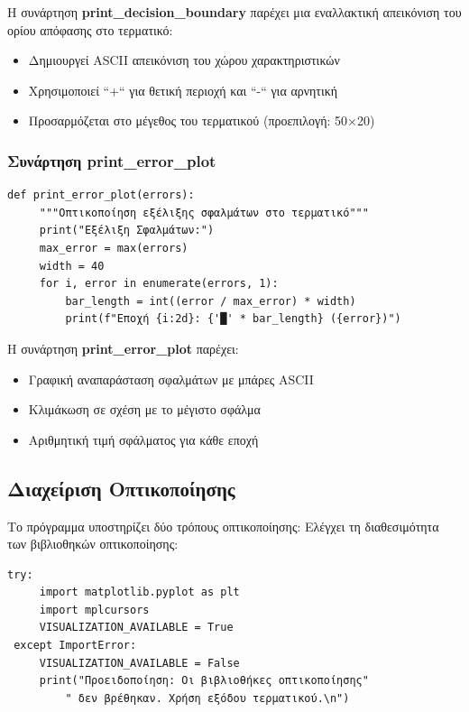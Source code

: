 \documentclass[12pt,a4paper,twoside]{book}
\begin{document}
Η συνάρτηση \textbf{print\_decision\_boundary} παρέχει μια εναλλακτική απεικόνιση του ορίου απόφασης στο τερματικό:
\begin{itemize}
    \item Δημιουργεί ASCII απεικόνιση του χώρου χαρακτηριστικών
    \item Χρησιμοποιεί ``+`` για θετική περιοχή και ``-`` για αρνητική
    \item Προσαρμόζεται στο μέγεθος του τερματικού (προεπιλογή: 50×20)
\end{itemize}

\subsubsection{Συνάρτηση print\_error\_plot}

\begin{tcolorbox}[myCustomStyle = {perceptron.py}]
    \begin{lstlisting}[style=myPythonStyle]
 def print_error_plot(errors):
     """Οπτικοποίηση εξέλιξης σφαλμάτων στο τερματικό"""
     print("Εξέλιξη Σφαλμάτων:")
     max_error = max(errors)
     width = 40
     for i, error in enumerate(errors, 1):
         bar_length = int((error / max_error) * width)
         print(f"Εποχή {i:2d}: {'█' * bar_length} ({error})")
    \end{lstlisting}
\end{tcolorbox}

Η συνάρτηση \textbf{print\_error\_plot} παρέχει:
\begin{itemize}
    \item Γραφική αναπαράσταση σφαλμάτων με μπάρες ASCII
    \item Κλιμάκωση σε σχέση με το μέγιστο σφάλμα
    \item Αριθμητική τιμή σφάλματος για κάθε εποχή
\end{itemize}

\subsection{Διαχείριση Οπτικοποίησης}

Το πρόγραμμα υποστηρίζει δύο τρόπους οπτικοποίησης:
Ελέγχει τη διαθεσιμότητα των βιβλιοθηκών οπτικοποίησης:
\begin{tcolorbox}[myCustomStyle = {perceptron.py}]
\begin{lstlisting}[style=myPythonStyle]
 try:
     import matplotlib.pyplot as plt
     import mplcursors
     VISUALIZATION_AVAILABLE = True
 except ImportError:
     VISUALIZATION_AVAILABLE = False
     print("Προειδοποίηση: Οι βιβλιοθήκες οπτικοποίησης"
         " δεν βρέθηκαν. Χρήση εξόδου τερματικού.\n")
\end{lstlisting}
\end{tcolorbox}
\end{document}
